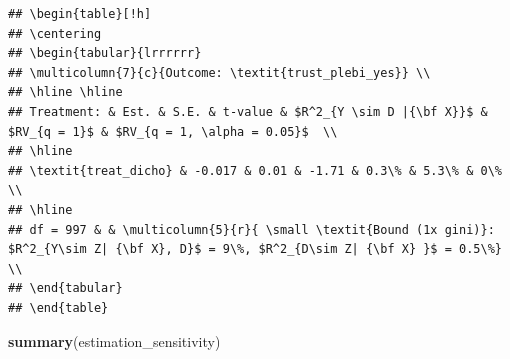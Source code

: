 \documentclass[
]{article}
\newenvironment{Shaded}{\begin{snugshade}}{\end{snugshade}}
\newcommand{\FunctionTok}[1]{\textcolor[rgb]{0.13,0.29,0.53}{\textbf{#1}}}
\newcommand{\NormalTok}[1]{#1}
\begin{document}
\begin{verbatim}
## \begin{table}[!h]
## \centering
## \begin{tabular}{lrrrrrr}
## \multicolumn{7}{c}{Outcome: \textit{trust_plebi_yes}} \\
## \hline \hline 
## Treatment: & Est. & S.E. & t-value & $R^2_{Y \sim D |{\bf X}}$ & $RV_{q = 1}$ & $RV_{q = 1, \alpha = 0.05}$  \\ 
## \hline 
## \textit{treat_dicho} & -0.017 & 0.01 & -1.71 & 0.3\% & 5.3\% & 0\% \\ 
## \hline 
## df = 997 & & \multicolumn{5}{r}{ \small \textit{Bound (1x gini)}: $R^2_{Y\sim Z| {\bf X}, D}$ = 9\%, $R^2_{D\sim Z| {\bf X} }$ = 0.5\%} \\
## \end{tabular}
## \end{table}
\end{verbatim}

\begin{Shaded}
\begin{Highlighting}[]
\FunctionTok{summary}\NormalTok{(estimation\_sensitivity)}
\end{Highlighting}
\end{Shaded}
\end{document}

